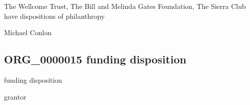 \documentclass[letterpaper,10pt,english]{sphinxmanual}
\begin{document}
\begin{sphinxShadowBox}

\sphinxAtStartPar
The Wellcome Trust, The Bill and Melinda Gates Foundation, The Sierra Club have dispositions of philanthropy
\end{sphinxShadowBox}

\begin{sphinxShadowBox}

\sphinxAtStartPar
{}
\end{sphinxShadowBox}

\begin{sphinxShadowBox}

\sphinxAtStartPar
Michael Conlon 
\end{sphinxShadowBox}
\begin{quote}

\ignorespaces \end{quote}


\subsection{ORG\_0000015 \sphinxhyphen{} funding disposition}
\label{\detokenize{doc-ORG_0000015:org-0000015-funding-disposition}}\label{\detokenize{doc-ORG_0000015:index-0}}\label{\detokenize{doc-ORG_0000015::doc}}
\begin{sphinxShadowBox}

\sphinxAtStartPar
funding disposition
\end{sphinxShadowBox}

\begin{sphinxShadowBox}

\sphinxAtStartPar
grantor
\end{sphinxShadowBox}

\begin{sphinxShadowBox}

\sphinxAtStartPar
{\hyperref[\detokenize{doc-BFO_0000016::doc}]{}}
\end{sphinxShadowBox}
\end{document}
